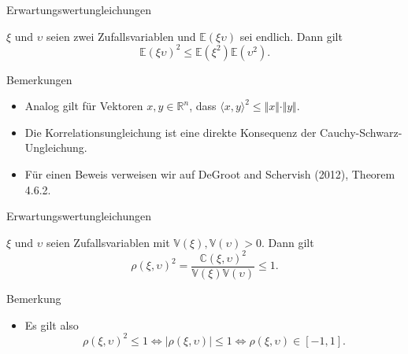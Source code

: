 \documentclass[
  8pt,
  ignorenonframetext,
]{beamer}
\providecommand{\tightlist}{%
  \setlength{\itemsep}{0pt}\setlength{\parskip}{0pt}}
\newcommand{\ups}{\upsilon}
\begin{document}
\begin{frame}{Erwartungswertungleichungen}
\protect\hypertarget{erwartungswertungleichungen}{}
\small
\begin{theorem}
\normalfont
\justifying
$\xi$ und $\ups$ seien zwei Zufallsvariablen und $\mathbb{E}(\xi\ups)$ sei endlich. 
Dann gilt
\begin{equation}
\mathbb{E}(\xi\ups)^2 \le \mathbb{E}\left(\xi^2\right)\mathbb{E}\left(\ups^2 \right).
\end{equation}
\end{theorem}

Bemerkungen

\begin{itemize}
\tightlist
\item
  Analog gilt für Vektoren \(x,y \in \mathbb{R}^n\), dass
  \(\langle x,y \rangle^2 \le \Vert x \Vert \cdot \Vert y \Vert\).
\item
  Die Korrelationsungleichung ist eine direkte Konsequenz der
  Cauchy-Schwarz-Ungleichung.
\item
  Für einen Beweis verweisen wir auf DeGroot and Schervish (2012),
  Theorem 4.6.2.
\end{itemize}
\end{frame}

\begin{frame}{Erwartungswertungleichungen}
\protect\hypertarget{erwartungswertungleichungen-1}{}
\small
\begin{theorem}[Korrelationsungleichung]
\justifying
\normalfont
$\xi$ und $\ups$ seien Zufallsvariablen mit $\mathbb{V}(\xi), \mathbb{V}(\ups) > 0$. Dann gilt
\begin{equation}
\rho(\xi,\ups)^2
= \frac{\mathbb{C}(\xi,\ups)^2}{\mathbb{V}(\xi)\mathbb{V}(\ups)}
\le 1.
\end{equation}
\end{theorem}

Bemerkung

\begin{itemize}
\tightlist
\item
  Es gilt also \begin{equation}
  \rho(\xi,\ups)^2 \le 1 \Leftrightarrow |\rho(\xi,\ups)| \le 1 \Leftrightarrow \rho(\xi,\ups) \in [-1,1].
  \end{equation}
\end{itemize}
\end{frame}
\end{document}
